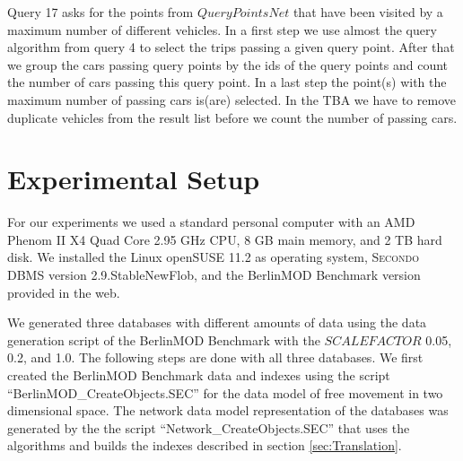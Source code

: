 \documentclass[a4paper]{article}
\newcommand{\secondo}{\textsc{Secondo}}
\newcommand{\bmodb} {BerlinMOD Benchmark}
\newcommand{\secver}{2.9.StableNewFlob}
\begin{document}
{Query 17 asks for the points from $QueryPointsNet$ that have been visited by a
maximum number of different vehicles. In a first step we use almost the query
algorithm from query 4 to select the trips passing a given query
point. After that we group the cars passing query points by the ids of the
query points and count the number of cars passing this query point. In a last
step the point(s) with the maximum number of passing cars is(are) selected.
In the TBA we have to remove duplicate vehicles from the result list before we
count the number of passing cars.
\section{Experimental Setup}
\label{sec:scenario}
For our experiments we used a standard personal computer with an AMD Phenom II X4
Quad Core 2.95 GHz CPU, 8 GB main memory, and 2 TB hard disk. We installed the
Linux openSUSE 11.2 as operating system, \secondo{} DBMS version \secver{}, and
the \bmodb{} version provided in the web.

We generated three databases with different amounts of data using the data generation
script of the \bmodb{} with the $SCALEFACTOR$ 0.05, 0.2, and 1.0. The following
steps are done with all three databases. We first created the \bmodb{} data and indexes
using the script ``BerlinMOD\_CreateObjects.SEC'' for the data model of free movement
in two dimensional space. The network data model representation of the databases
was generated by the the script ``Network\_CreateObjects.SEC'' that uses the algorithms
and builds the indexes described in section \ref{sec:Translation}.

}
\end{document}
